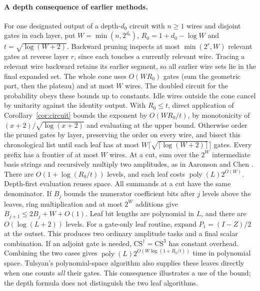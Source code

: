 \documentclass[11pt]{article}
\newcommand{\poly}{\operatorname{poly}}
\begin{document}
\paragraph{A depth consequence of earlier methods.}
For one designated output of a depth-$d_0$ circuit with $n\ge1$ wires and disjoint gates in each layer, put $W=\min(n,2^{d_0})$, $R_0=1+d_0-\log W$ and $t=\sqrt{\log(W+2)}$. Backward pruning inspects at most $\min(2^r,W)$ relevant gates at reverse layer $r$, since each touches a currently relevant wire. Tracing a relevant wire backward retains its earlier segment, so all earlier wire sets lie in the final expanded set. The whole cone uses $O(WR_0)$ gates (sum the geometric part, then the plateau) and at most $W$ wires. The doubled circuit for the probability obeys these bounds up to constants. Idle wires outside the cone cancel by unitarity against the identity output. With $R_0\le t$, direct application of Corollary~\ref{cor:circuit} bounds the exponent by $O(WR_0/t)$, by monotonicity of $(x+2)/\sqrt{\log(x+2)}$ and evaluating at the upper bound. Otherwise order the pruned gates by layer, preserving the order on every wire, and bisect this chronological list until each leaf has at most $W\lceil\sqrt{\lceil\log(W+2)\rceil}\rceil$ gates. Every prefix has a frontier of at most $W$ wires. At a cut, sum over the $2^W$ intermediate basis strings and recursively multiply two amplitudes, as in Aaronson and Chen \cite{ac}. There are $O(1+\log(R_0/t))$ levels, and each leaf costs $\poly(L)2^{O(W)}$. Depth-first evaluation reuses space. All summands at a cut have the same denominator. If $B_j$ bounds the numerator coefficient bits after $j$ levels above the leaves, ring multiplication and at most $2^W$ additions give $B_{j+1}\le 2B_j+W+O(1)$. Leaf bit lengths are polynomial in $L$, and there are $O(\log(L+2))$ levels. For a gate-only leaf routine, expand $P_1=(I-Z)/2$ at the outset. This produces two ordinary amplitude tasks and a final scalar combination. If an adjoint gate is needed, $\mathrm{CS}^\dagger=\mathrm{CS}^3$ has constant overhead. Combining the two cases gives $\poly(L)2^{O(W\log(1+R_0/t))}$ time in polynomial space. Tulsyan's polynomial-space algorithm also supplies these leaves directly when one counts \emph{all} their gates. This consequence illustrates a use of the bound; the depth formula does not distinguish the two leaf algorithms.
\end{document}
